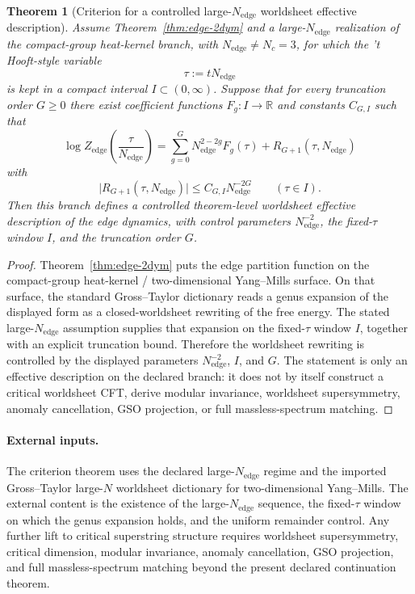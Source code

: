 \documentclass[11pt]{article}
\newtheorem{theorem}{Theorem}[section]
\begin{document}
\begin{theorem}[Criterion for a controlled large-$N_{\mathrm{edge}}$ worldsheet effective description]\label{thm:worldsheet-largeN}
Assume Theorem~\ref{thm:edge-2dym} and a large-$N_{\mathrm{edge}}$
realization of the compact-group heat-kernel branch, with \(N_{\mathrm{edge}}\neq N_c=3\), for
which the 't Hooft-style variable
\[
\tau:=tN_{\mathrm{edge}}
\]
is kept in a compact interval \(I\subset (0,\infty)\). Suppose that for every truncation
order \(G\ge 0\) there exist coefficient functions \(F_g:I\to\mathbb R\) and constants
\(C_{G,I}\) such that
\[
\log Z_{\mathrm{edge}}\!\left(\frac{\tau}{N_{\mathrm{edge}}}\right)
=
\sum_{g=0}^{G} N_{\mathrm{edge}}^{2-2g} F_g(\tau)
+
R_{G+1}(\tau,N_{\mathrm{edge}})
\]
with
\[
\bigl|R_{G+1}(\tau,N_{\mathrm{edge}})\bigr|
\le
C_{G,I}N_{\mathrm{edge}}^{-2G}
\qquad(\tau\in I).
\]
Then this branch defines a controlled theorem-level worldsheet effective description of the edge
dynamics, with control parameters \(N_{\mathrm{edge}}^{-2}\), the fixed-\(\tau\) window \(I\),
and the truncation order \(G\).
\end{theorem}

\begin{proof}
Theorem~\ref{thm:edge-2dym} puts the edge partition function on the compact-group heat-kernel /
two-dimensional Yang--Mills surface. On that surface, the standard Gross--Taylor dictionary reads
a genus expansion of the displayed form as a closed-worldsheet rewriting of the free energy. The
stated large-\(N_{\mathrm{edge}}\) assumption supplies that expansion on the fixed-\(\tau\) window
\(I\), together with an explicit truncation bound. Therefore the worldsheet rewriting is
controlled by the displayed parameters \(N_{\mathrm{edge}}^{-2}\), \(I\), and \(G\). The
statement is only an effective description on the declared branch: it does not by itself construct
a critical worldsheet CFT, derive modular invariance, worldsheet supersymmetry, anomaly
cancellation, GSO projection, or full massless-spectrum matching.
\end{proof}

\paragraph{External inputs.}
The criterion theorem uses the declared large-\(N_{\mathrm{edge}}\) regime and the imported
Gross--Taylor large-\(N\) worldsheet dictionary for two-dimensional Yang--Mills. The external
content is the existence of the large-\(N_{\mathrm{edge}}\) sequence, the fixed-\(\tau\) window on
which the genus expansion holds, and the uniform remainder control. Any further lift to critical
superstring structure requires worldsheet supersymmetry, critical dimension, modular invariance,
anomaly cancellation, GSO projection, and full massless-spectrum matching beyond the present
declared continuation theorem.
\end{document}

